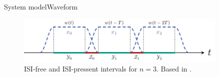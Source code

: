 \documentclass[en]{sdqbeamer}
\begin{document}
\begin{frame}{System model}{Waveform}


\begin{figure}
\begin{center}
\includegraphics[width=0.9\textwidth]{Tukey_ISI.pdf}
\caption{ISI-free and ISI-pressent intervals for $n=3$. Based in .}
\label{fig:Tukey_ISI}
\end{center}
\end{figure}


\end{frame}
\end{document}
